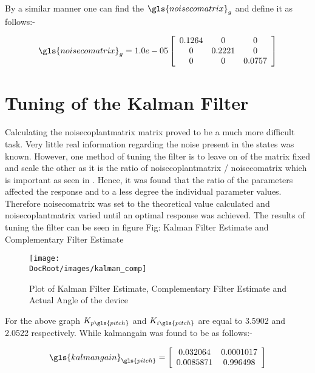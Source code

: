 By a similar manner one can find the $\gls{noisecomatrix}_g$ and define it as follows:-
	
							\begin{equation}
							\gls{noisecomatrix}_g  = 		
							1.0e-05\left[\begin{array}{ccc}
							0.1264      &                 0                          & 0\\ 
							0       & 0.2221           & 0\\
							0         &                0                          &0.0757
							\end{array} \right]
							\end{equation}
	
			 \tocless\section{Tuning of the Kalman Filter}
			Calculating the \gls{noisecoplantmatrix} matrix proved to be a much more difficult task. Very little real information regarding the noise present in the states was known. However, one method of tuning the filter is to leave on of the matrix fixed and scale the other as it is the ratio of \gls{noisecoplantmatrix} / \gls{noisecomatrix} which is important as seen in \cite{gordon_paper}. Hence, it was found that the ratio of the parameters affected the response and to a less degree the individual parameter values. Therefore \gls{noisecomatrix} was set to the theoretical value calculated and \gls{noisecoplantmatrix}  varied until an optimal response was achieved. The results of tuning the filter can be seen in figure {Fig: Kalman Filter Estimate and Complementary Filter Estimate }
	
		
\begin{figure}[h]
	\centering
	\texttt{[image: \\DocRoot/images/kalman\_comp]}
	\caption{Plot of Kalman Filter Estimate, Complementary Filter Estimate and Actual Angle of the device}
	\label{Fig: Kalman Filter Estimate and Complementary Filter Estimate }
\end{figure}

For the above graph $K_{p\gls{pitch}}$ and $K_{i\gls{pitch}}$ are equal to 3.5902 and 2.0522 respectively. While \gls{kalmangain} was found to be as follows:-

							\begin{equation}
							\gls{kalmangain}_{\gls{pitch}}  = 		
							\left[\begin{array}{cc}
							0.032064         &      0.0001017                         \\ 
							0.0085871       &     0.996498           
							\end{array} \right]
							\end{equation}



